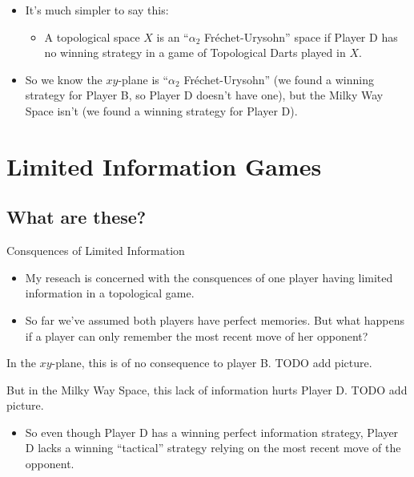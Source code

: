 \documentclass{beamer}
\begin{document}
\begin{frame}
  \begin{itemize}
    \item
      It's much simpler to say this:
    \pause
      \begin{itemize}
        \item
          A topological space $X$ is an ``$\alpha_2$ Fr\'echet-Urysohn'' space if Player D has no winning strategy in a game of Topological Darts played in $X$.
      \end{itemize}
    \pause
    \item
      So we know the $xy$-plane is ``$\alpha_2$ Fr\'echet-Urysohn'' (we found a winning strategy for Player B, so Player D doesn't have one), but the Milky Way Space isn't (we found a winning strategy for Player D).
  \end{itemize}
\end{frame}

\section{Limited Information Games}

\subsection{What are these?}

\begin{frame}{Consquences of Limited Information}
  \begin{itemize}
    \item
      My reseach is concerned with the consquences of one player having limited information in a topological game.
    \pause
    \item
      So far we've assumed both players have perfect memories. But what happens if a player can only remember the most recent move of her opponent?
  \end{itemize}
    \pause
  In the $xy$-plane, this is of no consequence to player B. TODO add picture.
\end{frame}
\begin{frame}
  But in the Milky Way Space, this lack of information hurts Player D. TODO add picture.
  \begin{itemize}
  \item
   So even though Player D has a winning perfect information strategy, Player D lacks a winning ``tactical'' strategy relying on the most recent move of the opponent.
  \end{itemize}
\end{frame}
\end{document}
